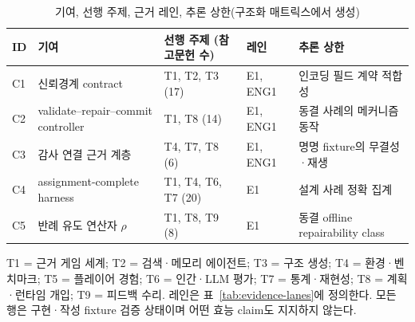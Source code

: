 \begin{table}[t]
\caption{기여, 선행 주제, 근거 레인, 추론 상한(구조화 매트릭스에서 생성)}
\label{tab:contribution-map}
\centering\scriptsize
\setlength{\tabcolsep}{4pt}
\renewcommand{\arraystretch}{1.20}

\begin{tabularx}{\columnwidth}{@{}l>{\raggedright\arraybackslash}X>{\raggedright\arraybackslash}p{}l>{\raggedright\arraybackslash}p{}@{}}
\toprule
\textbf{ID} & \textbf{기여} & \textbf{선행 주제 (참고문헌 수)} & \textbf{레인} & \textbf{추론 상한} \\
\midrule
C1 & 신뢰경계 contract & T1, T2, T3 (17) & E1, ENG1 & 인코딩 필드 계약 적합성 \\
C2 & validate--repair--commit controller & T1, T8 (14) & E1, ENG1 & 동결 사례의 메커니즘 동작 \\
C3 & 감사 연결 근거 계층 & T4, T7, T8 (6) & E1, ENG1 & 명명 fixture의 무결성·재생 \\
C4 & assignment-complete harness & T1, T4, T6, T7 (20) & E1 & 설계 사례 정확 집계 \\
C5 & 반례 유도 연산자 $\rho$ & T1, T8, T9 (8) & E1 & 동결 offline repairability class \\
\bottomrule
\end{tabularx}
\par\vspace{3pt}\noindent\parbox{0.96\columnwidth}{\scriptsize T1 = 근거 게임 세계; T2 = 검색·메모리 에이전트; T3 = 구조 생성; T4 = 환경·벤치마크; T5 = 플레이어 경험; T6 = 인간·LLM 평가; T7 = 통계·재현성; T8 = 계획·런타임 개입; T9 = 피드백 수리. 레인은 표~\ref{tab:evidence-lanes}에 정의한다. 모든 행은 구현·작성 fixture 검증 상태이며 어떤 효능 claim도 지지하지 않는다.}
\end{table}
